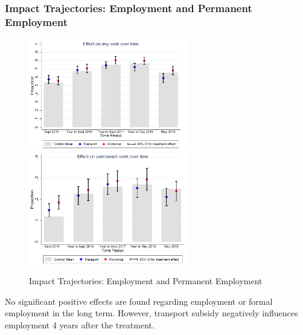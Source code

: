         \subsubsection{Impact Trajectories: Employment and Permanent Employment}
            \begin{figure}[H]
                \centering
                \includegraphics[width=2.75in]{images/ch6/Abebe result 2 emp.png}
                \includegraphics[width=2.75in]{images/ch6/Abebe result 2 perm emp.png}
                \caption{Impact Trajectories: Employment and Permanent Employment}
            \end{figure}
            No significant positive effects are found regarding employment or formal employment in the long term. However, transport subsidy negatively influences employment 4 years after the treatment.
            
